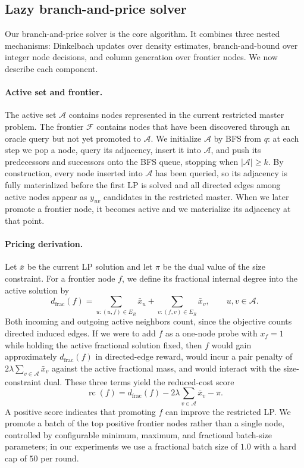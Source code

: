 \documentclass[12pt]{article}
\newcommand{\A}{\mathcal{A}}
\newcommand{\F}{\mathcal{F}}
\begin{document}
\subsection{Lazy branch-and-price solver}
\label{subsec:bp-solver}

Our branch-and-price solver is the core algorithm.  It combines three nested mechanisms: Dinkelbach updates over density estimates, branch-and-bound over integer node decisions, and column generation over frontier nodes.  We now describe each component.

\paragraph{Active set and frontier.}
The active set $\A$ contains nodes represented in the current restricted master problem.  The frontier $\F$ contains nodes that have been discovered through an oracle query but not yet promoted to $\A$.  We initialize $\A$ by BFS from $q$: at each step we pop a node, query its adjacency, insert it into $\A$, and push its predecessors and successors onto the BFS queue, stopping when $|\A|\ge k$.  By construction, every node inserted into $\A$ has been queried, so its adjacency is fully materialized before the first LP is solved and all directed edges among active nodes appear as $y_{uv}$ candidates in the restricted master.  When we later promote a frontier node, it becomes active and we materialize its adjacency at that point.

\paragraph{Pricing derivation.}
Let $\bar{x}$ be the current LP solution and let $\pi$ be the dual value of the size constraint.  For a frontier node $f$, we define its fractional internal degree into the active solution by
\begin{equation}
  \label{eq:fractional-degree}
  d_{\mathrm{frac}}(f)=
  \sum_{u:(u,f)\in E_R} \bar{x}_u+
  \sum_{v:(f,v)\in E_R} \bar{x}_v,
  \qquad u,v\in\A .
\end{equation}
Both incoming and outgoing active neighbors count, since the objective counts directed induced edges.  If we were to add $f$ as a one-node probe with $x_f=1$ while holding the active fractional solution fixed, then $f$ would gain approximately $d_{\mathrm{frac}}(f)$ in directed-edge reward, would incur a pair penalty of $2\lambda\sum_{v\in\A}\bar{x}_v$ against the active fractional mass, and would interact with the size-constraint dual.  These three terms yield the reduced-cost score
\begin{equation}
  \label{eq:reduced-cost}
  \operatorname{rc}(f)=d_{\mathrm{frac}}(f)
  -2\lambda\sum_{v\in\A}\bar{x}_v-
  \pi .
\end{equation}
A positive score indicates that promoting $f$ can improve the restricted LP.  We promote a batch of the top positive frontier nodes rather than a single node, controlled by configurable minimum, maximum, and fractional batch-size parameters; in our experiments we use a fractional batch size of $1.0$ with a hard cap of $50$ per round.
\end{document}

